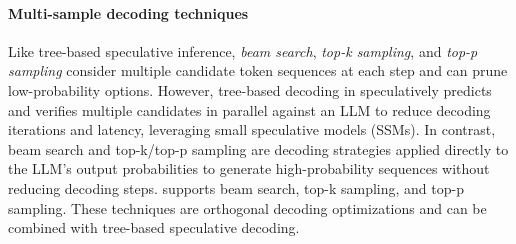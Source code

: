 \paragraph{Multi-sample decoding techniques}
Like tree-based speculative inference, \textit{beam search}, \textit{top-k sampling}, and \textit{top-p sampling} consider multiple candidate token sequences at each step and can prune low-probability options. However, tree-based decoding in \sys speculatively predicts and verifies multiple candidates in parallel against an LLM to reduce decoding iterations and latency, leveraging small speculative models (SSMs). In contrast, beam search and top-k/top-p sampling are decoding strategies applied directly to the LLM's output probabilities to generate high-probability sequences without reducing decoding steps. \sys supports beam search, top-k sampling, and top-p sampling. These techniques are orthogonal decoding optimizations and can be combined with tree-based speculative decoding.
 
